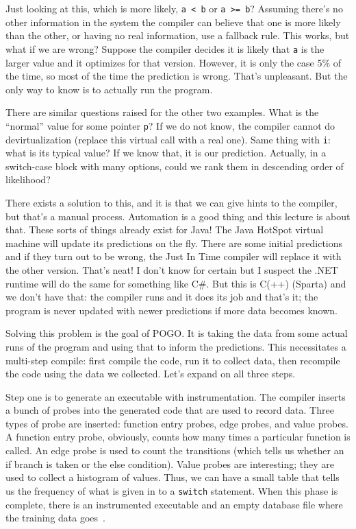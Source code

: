 \documentclass[a4paper]{report}
\begin{document}
Just looking at this, which is more likely, \texttt{a < b} or \texttt{a >= b}? Assuming there's no other information in the system the compiler can believe that one is more likely than the other, or having no real information, use a fallback rule. This works, but what if we are wrong? Suppose the compiler decides it is likely that \texttt{a} is the larger value and it optimizes for that version. However, it is only the case 5\% of the time, so most of the time the prediction is wrong. That's unpleasant. But the only way to know is to actually run the program.

There are similar questions raised for the other two examples. What is the ``normal'' value for some pointer \texttt{p}? If we do not know, the compiler cannot do devirtualization (replace this virtual call with a real one). Same thing with \texttt{i}: what is its typical value? If we know that, it is our prediction. Actually, in a switch-case block with many options, could we rank them in descending order of likelihood?

There exists a solution to this, and it is that we can give hints to the compiler, but that's a manual process. Automation is a good thing and this lecture is about that. These sorts of things already exist for Java! The Java HotSpot virtual machine will update its predictions on the fly. There are some initial predictions and if they turn out to be wrong, the Just In Time compiler will replace it with the other version. That's neat! I don't know for certain but I suspect the .NET runtime will do the same for something like C\#. But this is C(++) (Sparta) and we don't have that: the compiler runs and it does its job and that's it; the program is never updated with newer predictions if more data becomes known.

Solving this problem is the goal of POGO. It is taking the data from some actual runs of the program and using that to inform the predictions. This necessitates a multi-step compile: first compile the code, run it to collect data, then recompile the code using the data we collected. Let's expand on all three steps.

Step one is to generate an executable with instrumentation. The compiler inserts a bunch of probes into the generated code that are used to record data. Three types of probe are inserted: function entry probes, edge probes, and value probes.  A function entry probe, obviously, counts how many times a particular function is called. An edge probe is used to count the transitions (which tells us whether an if branch is taken or the else condition). Value probes are interesting; they are used to collect a histogram of values. Thus, we can have a small table that tells us the frequency of what is given in to a \texttt{switch} statement. When this phase is complete, there is an instrumented executable and an empty database file where the training data goes~\cite{pogo}.
\end{document}
